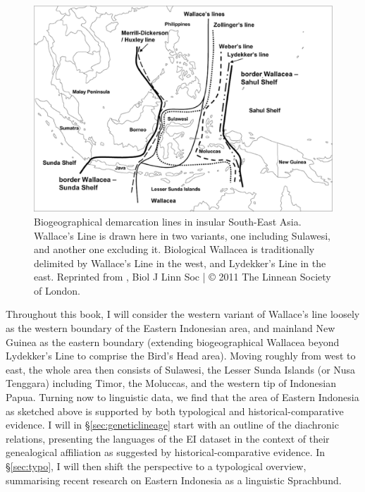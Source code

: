 \begin{figure}
\begin{center}
\includegraphics[width=1.0\textwidth]{figures/Wallacea2.eps}
\caption[Biogeographical demarcation lines in insular South-East Asia]{Biogeographical demarcation lines in insular South-East Asia. Wallace's Line is drawn here in two variants, one including Sulawesi, and another one excluding it. Biological Wallacea is traditionally delimited by Wallace's Line in the west, and Lydekker's Line in the east. Reprinted from \citealt{Welzen2011}, Biol J Linn Soc | © 2011 The Linnean Society of London.}\label{map:wallacea}
\end{center}
\end{figure}

Throughout this book, I will consider the western variant of Wallace's line loosely as the western boundary of the Eastern Indonesian area, and mainland New Guinea as the eastern boundary (extending biogeographical Wallacea beyond Lydekker's Line to comprise the Bird's Head area). Moving roughly from west to east, the whole area then consists of Sulawesi, the Lesser Sunda Islands (or Nusa Tenggara) including Timor, the Moluccas, and the western tip of Indonesian Papua. Turning now to linguistic data, we find that the area of Eastern Indonesia as sketched above is supported by both typological and historical-comparative evidence. I will in §\ref{sec:geneticlineage} start with an outline of the diachronic relations, presenting the languages of the EI dataset in the context of their genealogical affiliation as suggested by historical-comparative evidence. In §\ref{sec:typo}, I will then shift the perspective to a typological overview, summarising recent research on Eastern Indonesia as a linguistic Sprachbund. 

